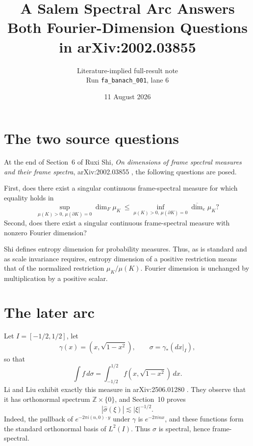 \documentclass[11pt]{article}
\title{A Salem Spectral Arc Answers Both Fourier-Dimension Questions\\
in arXiv:2002.03855}
\author{Literature-implied full-result note\\
Run \texttt{fa\_banach\_001}, lane 6}
\date{11 August 2026}
\begin{document}
\maketitle

\begin{center}
\end{center}

\section*{The two source questions}

At the end of Section~6 of Ruxi Shi,
\emph{On dimensions of frame spectral measures and their frame spectra},
arXiv:2002.03855 \cite{Shi}, the following questions are posed.

First, does there exist a singular continuous frame-spectral measure for
which equality holds in
\begin{equation}\label{eq:Shi}
 \sup_{\mu(K)>0,\,\mu(\partial K)=0}\dim_F\mu_K
 \ \leq\!
 \inf_{\mu(K)>0,\,\mu(\partial K)=0}
 \overline{\dim}_e\mu_K?
\end{equation}
Second, does there exist a singular continuous frame-spectral measure with
nonzero Fourier dimension?

Shi defines entropy dimension for probability measures.  Thus, as is
standard and as scale invariance requires, entropy dimension of a positive
restriction means that of the normalized restriction
\(\mu_K/\mu(K)\).  Fourier dimension is unchanged by multiplication by a
positive scalar.

\section*{The later arc}

Let \(I=[-1/2,1/2]\), let
\[
 \gamma(x)=(x,\sqrt{1-x^2}),
 \qquad \sigma=\gamma_*(dx|_I),
\]
so that
\[
 \int f\,d\sigma=\int_{-1/2}^{1/2}
 f(x,\sqrt{1-x^2})\,dx.
\]
Li and Liu exhibit exactly this measure in arXiv:2506.01280
\cite{LiLiu}.  They observe that it has orthonormal spectrum
\(\mathbb Z\times\{0\}\), and Section~10 proves
\begin{equation}\label{eq:decay}
 |\widehat\sigma(\xi)|\lesssim |\xi|^{-1/2}.
\end{equation}
Indeed, the pullback of
\(e^{-2\pi i (n,0)\cdot y}\) under \(\gamma\) is
\(e^{-2\pi i nx}\), and these functions form the standard orthonormal basis
of \(L^2(I)\).  Thus \(\sigma\) is spectral, hence frame-spectral.
\end{document}
